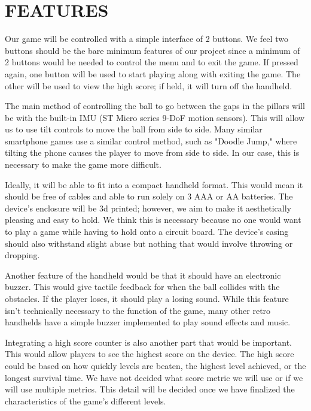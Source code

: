 \documentclass[12pt]{article}
\begin{document}
\newpage
\section{FEATURES}
Our game will be controlled with a simple interface of 2 buttons. We feel two buttons should be the bare minimum features of our project since a minimum of 2 buttons would be needed to control the menu and to exit the game. If pressed again, one button will be used to start playing along with exiting the game. The other will be used to view the high score; if held, it will turn off the handheld.

The main method of controlling the ball to go between the gaps in the pillars will be with the built-in IMU (ST Micro series 9-DoF motion sensors). This will allow us to use tilt controls to move the ball from side to side. Many similar smartphone games use a similar control method, such as "Doodle Jump," where tilting the phone causes the player to move from side to side. In our case, this is necessary to make the game more difficult.

Ideally, it will be able to fit into a compact handheld format. This would mean it should be free of cables and able to run solely on 3 AAA or AA batteries. The device's enclosure will be 3d printed; however, we aim to make it aesthetically pleasing and easy to hold. We think this is necessary because no one would want to play a game while having to hold onto a circuit board. The device's casing should also withstand slight abuse but nothing that would involve throwing or dropping.

Another feature of the handheld would be that it should have an electronic buzzer. This would give tactile feedback for when the ball collides with the obstacles. If the player loses, it should play a losing sound. While this feature isn't technically necessary to the function of the game, many other retro handhelds have a simple buzzer implemented to play sound effects and music.

Integrating a high score counter is also another part that would be important. This would allow players to see the highest score on the device. The high score could be based on how quickly levels are beaten, the highest level achieved, or the longest survival time. We have not decided what score metric we will use or if we will use multiple metrics. This detail will be decided once we have finalized the characteristics of the game's different levels.
\end{document}
